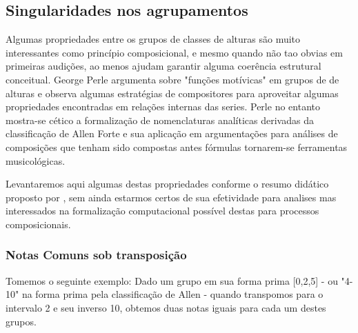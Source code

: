 \documentclass[
	12pt,				%
	openright,			%
	twoside,			%
	a4paper,			%
	english,			%
	french,				%
	spanish,			%
	brazil				%
	]{abntex2}
\begin{document}




\subsection{Singularidades nos agrupamentos }

Algumas propriedades entre os grupos de classes de alturas são muito interessantes como princípio composicional, e mesmo quando não tao obvias em primeiras audições, ao menos ajudam garantir alguma coerência estrutural conceitual. George Perle argumenta sobre "funções motívicas" em grupos de de alturas\cite[ p.60-85]{perle1991serial} e observa algumas estratégias de compositores para aproveitar algumas propriedades encontradas em relações internas das series. Perle no entanto mostra-se cético a formalização de nomenclaturas analíticas derivadas da classificação de Allen Forte e sua aplicação em argumentações para análises de composições que tenham sido compostas antes fórmulas tornarem-se ferramentas musicológicas.\cite{perle1990pitch}

Levantaremos aqui algumas destas propriedades conforme o resumo didático proposto por \cite{straus2004}, sem ainda estarmos certos de sua efetividade para analises mas interessados na formalização computacional possível destas para processos composicionais.


\subsubsection{Notas Comuns sob transposição}

Tomemos o seguinte exemplo: Dado um grupo em sua forma prima [0,2,5] - ou "4-10" na forma prima pela classificação de Allen  - quando transpomos para o intervalo 2 e seu inverso 10, obtemos duas notas iguais para cada um destes grupos.
\end{document}
